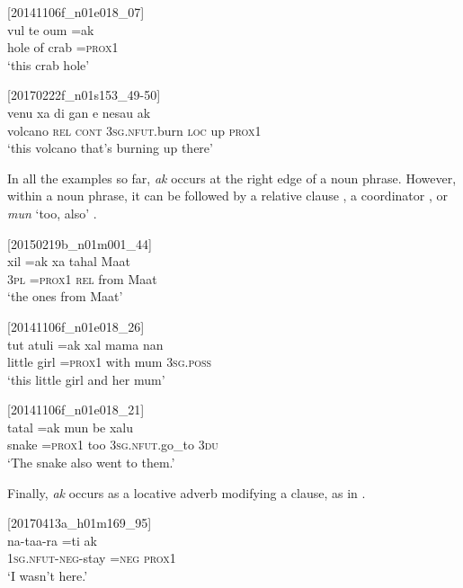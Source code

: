\documentclass[output=paper,colorlinks,citecolor=brown]{langscibook}
\begin{document}
\ea
{\label{ex:ridge:11}[20141106f\_n01e018\_07]}\\
\gll {\ob}vul   {\ob}te   oum{\cb}{\cb}   =ak\\
     {\db}hole  {\db}of  crab    \textsc{=prox1}\\
\glt ‘this crab hole’
\z

\ea
{\label{ex:ridge:12}[20170222f\_n01s153\_49-50]}\\
\gll {\ob}venu  {\ob}xa  di  gan      e  nesau{\cb}{\cb}  ak\\
     {\db}volcano  {\db}\textsc{rel}  \textsc{cont}  \textsc{3sg.nfut.}burn  \textsc{loc}  up  \textsc{prox1}\\
\glt ‘this volcano that’s burning up there’
\z

In all the examples so far, \textit{ak} occurs at the right edge of a noun phrase. However, within a noun phrase, it can be followed by a relative clause , a coordinator , or \textit{mun} ‘too, also’ .

\ea
{\label{ex:ridge:13}[20150219b\_n01m001\_44]}\\
\gll {\ob}xil  =ak{\cb}    {\ob}xa  {\ob}tahal  Maat{\cb}{\cb}\\
     {\db}\textsc{3pl}  \textsc{=prox1}  {\db}\textsc{rel}  {\db}from  Maat\\
\glt ‘the ones from Maat’
\z

\ea
{\label{ex:ridge:14}[20141106f\_n01e018\_26]}\\
\gll {\ob}{\ob}{\ob}tut  atuli{\cb}  =ak{\cb}    xal  {\ob}mama  nan{\cb}{\cb}\\
     {\db}{\db}{\db}little girl  \textsc{=prox1} with  {\db}mum \textsc{3sg.poss}\\
\glt ‘this little girl and her mum’
\z

\ea
{\label{ex:ridge:15}[20141106f\_n01e018\_21]}\\
\gll {\ob}{\ob}tatal   =ak{\cb}     mun{\cb}  be      xalu\\
     {\db}{\db}snake  \textsc{=prox1}  too  \textsc{3sg.nfut}.go\_to  \textsc{3du}\\
\glt ‘The snake also went to them.’
\z

Finally, \textit{ak} occurs as a locative adverb modifying a clause, as in .

\ea
{\label{ex:ridge:16}[20170413a\_h01m169\_95]}\\
\gll na-taa-ra    =ti  ak\\
     \textsc{1sg.nfut-neg-}stay  \textsc{=neg}  \textsc{prox1}\\
\glt ‘I wasn’t here.’
\z
\end{document}
